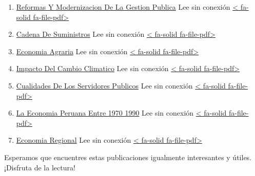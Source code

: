 \documentclass[
  jou,
  floatsintext,
  longtable,
  a4paper,
  nolmodern,
  notxfonts,
  notimes,
  colorlinks=true,linkcolor=blue,citecolor=blue,urlcolor=blue]{apa7}
\begin{document}
\begin{enumerate}
\item
  \href{https://achalmaedison.netlify.app/blog/posts/2021-10-01-reformas-y-modernizacion-de-la-gestion-publica}{Reformas
  Y Modernizacion De La Gestion Publica} Lee sin conexión
  \href{https://achalmaedison.netlify.app/blog/posts/2021-10-01-reformas-y-modernizacion-de-la-gestion-publica/index.pdf}{{{< fa-solid fa-file-pdf>}}}
\item
  \href{https://achalmaedison.netlify.app/blog/posts/2022-01-23-cadena\%20de\%20suministros}{Cadena
  De Suministros} Lee sin conexión
  \href{https://achalmaedison.netlify.app/blog/posts/2022-01-23-cadena\%20de\%20suministros/index.pdf}{{{< fa-solid fa-file-pdf>}}}
\item
  \href{https://achalmaedison.netlify.app/blog/posts/2022-04-22-economia-agraria}{Economia
  Agraria} Lee sin conexión
  \href{https://achalmaedison.netlify.app/blog/posts/2022-04-22-economia-agraria/index.pdf}{{{< fa-solid fa-file-pdf>}}}
\item
  \href{https://achalmaedison.netlify.app/blog/posts/2022-06-02-impacto-del-cambio-climatico}{Impacto
  Del Cambio Climatico} Lee sin conexión
  \href{https://achalmaedison.netlify.app/blog/posts/2022-06-02-impacto-del-cambio-climatico/index.pdf}{{{< fa-solid fa-file-pdf>}}}
\item
  \href{https://achalmaedison.netlify.app/blog/posts/2023-05-11-cualidades-de-los-servidores-publicos}{Cualidades
  De Los Servidores Publicos} Lee sin conexión
  \href{https://achalmaedison.netlify.app/blog/posts/2023-05-11-cualidades-de-los-servidores-publicos/index.pdf}{{{< fa-solid fa-file-pdf>}}}
\item
  \href{https://achalmaedison.netlify.app/blog/posts/2023-05-12-la-economia-peruana-entre-1970-1990}{La
  Economia Peruana Entre 1970 1990} Lee sin conexión
  \href{https://achalmaedison.netlify.app/blog/posts/2023-05-12-la-economia-peruana-entre-1970-1990/index.pdf}{{{< fa-solid fa-file-pdf>}}}
\item
  \href{https://achalmaedison.netlify.app/blog/posts/2023-05-16-economia-regional}{Economia
  Regional} Lee sin conexión
  \href{https://achalmaedison.netlify.app/blog/posts/2023-05-16-economia-regional/index.pdf}{{{< fa-solid fa-file-pdf>}}}
\end{enumerate}

Esperamos que encuentres estas publicaciones igualmente interesantes y
útiles. ¡Disfruta de la lectura!
\end{document}
